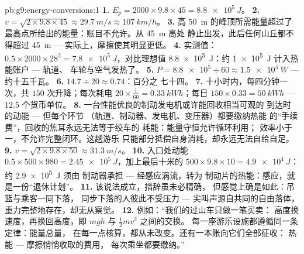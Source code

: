 \begin{solution}{pb:g9:energy-conversions:1}
\textbf{1.} $E_p = 2000 \times 9.8 \times 45 =
\qty{8.8e5}{J}$。
\textbf{2.} $v = \sqrt{2 \times 9.8 \times 45} \approx
\qty{29.7}{m/s} \approx \qty{107}{km/h}$。
\textbf{3.} 高 \qty{50}{m} 的峰顶所需能量超过了
最高点所给出的能量：账目不允许。从 \qty{45}{m} 高处
静止出发，此后任何山丘都不得超过 \qty{45}{m} ---
实际上，摩擦使其明显更低。
\textbf{4.} 实测值：$0.5 \times 2000 \times 28^2 =
\qty{7.8e5}{J}$，对比理想值 \qty{8.8e5}{J}：约
\qty{1e5}{J} 计入热能账户 --- 轨道、
车轮与空气发热了。
\textbf{5.} $P = \num{8.8e5} \div 60 \approx
\qty{1.5e4}{W}$ --- 约十五千瓦。
\textbf{6.} $14.7 \div 20 \approx 0.74$：百分之
七十四。
\textbf{7.} 十小时内，每四分钟一次，共 $150$
次升降；每次耗电 $20 \times \tfrac{1}{60} =
\qty{0.33}{kWh}$；每日 $150 \times 0.33 = \qty{50}{kWh}$
--- $12.5$ 个货币单位。
\textbf{8.} 一台性能优良的制动发电机或许能回收相当可观的
到达时的动能 --- 但每个环节
（轨道、制动器、发电机、变压器）都要缴纳热能
的“手续费”，回收的焦耳永远无法等于绞车的
耗能：能量守恒允许循环利用；
效率小于一，不允许完整闭环。这趟游乐
只能部分抵偿自身消耗，却永远无法自给自足。
\textbf{9.} $v = \sqrt{2 \times 9.8 \times 50} \approx
\qty{31.3}{m/s}$。
\textbf{10.} 入口处动能 $0.5 \times 500 \times 980 =
\qty{2.45e5}{J}$，加上最后十米的 $500 \times 9.8
\times 10 = \qty{4.9e4}{J}$：约 \qty{2.9e5}{J} 须由
制动器承担 --- 经感应涡流，转为
制动片的热能：感应，就是一份“退休计划”。
\textbf{11.} 该说法成立，措辞虽未必精确，
但感觉上确是如此：吊篮与乘客一同下落，
同步下落的人彼此不受压力 --- 尖叫声源自共同的自由落体，
重力完整地存在，却无从察觉。
\textbf{12.} 例如：“我们的过山车只做一笔买卖：
高度换速度，再换回高度，即 $m g h$ 与 $\frac12 m v^2$ 之间的交换。
每一座游乐设施都遵循同一条定律：能量总量，
在每一点核算，都从未改变。还有一本账向它们全部征收：
热能 --- 摩擦悄悄收取的费用，
每次乘坐都要缴纳。”
\end{solution}
